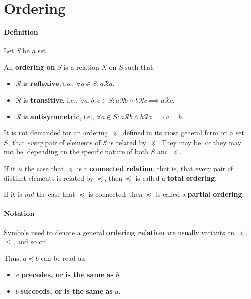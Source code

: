 \section{Ordering}
\label{sec:ordering}

\paragraph{Definition}

Let $S$ be a set.

An \textbf{ordering on} $S$ is a relation $\mathcal{R}$ on $S$ such
that:

\begin{itemize}
\item $\mathcal{R}$ is \textbf{reflexive}, i.e., $\forall a \in S: a \mathcal{R} a$.
\item $\mathcal{R}$ is \textbf{transitive}, i.e.,
  $\forall a, b, c \in S: a \mathcal{R} b \land b \mathcal{R} c
  \implies a \mathcal{R} c$.
\item $\mathcal{R}$ is \textbf{antisymmetric}, i.e.,
  $\forall a \in S : a \mathcal{R} b \land b \mathcal{R} a \implies a
  = b$.
\end{itemize}

It is not demanded for an ordering $\preceq$, defined in its most
general form on a set $S$, that \textit{every} pair of elements of $S$
is related by $\preceq$. They may be, or they may not be, depending on
the specific nature of both $S$ and $\preceq$.

If it \textit{is} the case that $\preceq$ is a \textbf{connected
  relation}, that is, that every pair of distinct elements is related
by $\preceq$, then $\preceq$ is called a \textbf{total ordering}.

If it is \textit{not} the case that $\preceq$ is connected, then
$\preceq$ is called a \textbf{partial ordering}.


\paragraph{Notation}

Symbols used to denote a general \textbf{ordering relation} are
usually variants on $\preceq$, $\leq$, and so on.

Thus, $a \preceq b$ can be read as:
\begin{itemize}
\item $a$ \textbf{precedes, or is the same as} $b$.
\item $b$ \textbf{succeeds, or is the same as} $a$.
\end{itemize}

